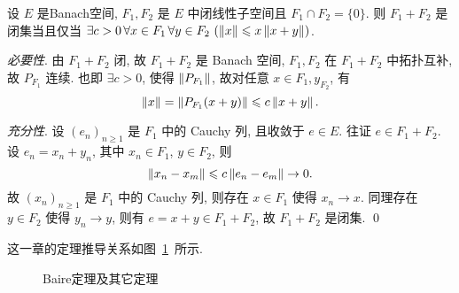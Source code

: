 	\begin{Theorem}
		设 $ E $ 是Banach空间,  $ F_{1}, F_{2} $ 是 $ E $ 中闭线性子空间且 $ F_{1}\cap F_{2}=\{ 0 \} $. 则 $ F_{1}+F_{2} $ 是闭集当且仅当 $ \exists c>0\,\forall x\in F_{1}\,\forall y\in F_{2}\,\left( \left\| x \right\|\leqslant x\left\| x+y \right\| \right) $. 
	\end{Theorem}
	\begin{Proof}
		\textsl{必要性}. 由 $ F_{1}+F_{2} $ 闭, 故 $ F_{1}+F_{2} $ 是 Banach 空间,  $ F_{1}, F_{2} $ 在 $ F_{1}+F_{2} $ 中拓扑互补, 故 $ P_{F_{1}} $ 连续. 也即 $ \exists c>0 $, 使得 $ \left\| P_{F_{1}} \right\| $, 故对任意 $ x\in F_{1}, y_{F_{2}} $, 有
		\[
			\left\| x \right\| = \left\| P_{F_{1}}(x+y) \right\|\leqslant c\left\| x+y \right\|.
		\]
		
		\textsl{充分性}. 设 $ (e_{n})_{n\geqslant1} $ 是 $ F_{1} $ 中的 Cauchy 列, 且收敛于 $ e\in E $. 往证 $ e\in F_{1}+F_{2} $. 设 $ e_{n}=x_{n}+y_{n} $, 其中 $ x_{n}\in F_{1} $, $ y\in F_{2} $, 则
		\[
			\left\| x_{n}-x_{m} \right\|\leqslant c\left\| e_{n}-e_{m} \right\|\to 0.
		\]
		故 $ (x_{n})_{n\geqslant1} $ 是 $ F_{1} $ 中的 Cauchy 列, 则存在 $ x\in F_{1} $ 使得 $ x_{n}\to x $. 同理存在  $ y\in F_{2} $ 使得  $ y_{n}\to y $, 则有 $ e=x+y\in F_{1}+F_{2} $, 故 $ F_{1}+F_{2} $ 是闭集. \qed
	\end{Proof}

	这一章的定理推导关系如图~\ref{fig:Baire}~所示.
	\begin{figure}[hb!]
		\begin{center}
			\caption{Baire定理及其它定理}
			\label{fig:Baire}
		\end{center}
	\end{figure}
	

